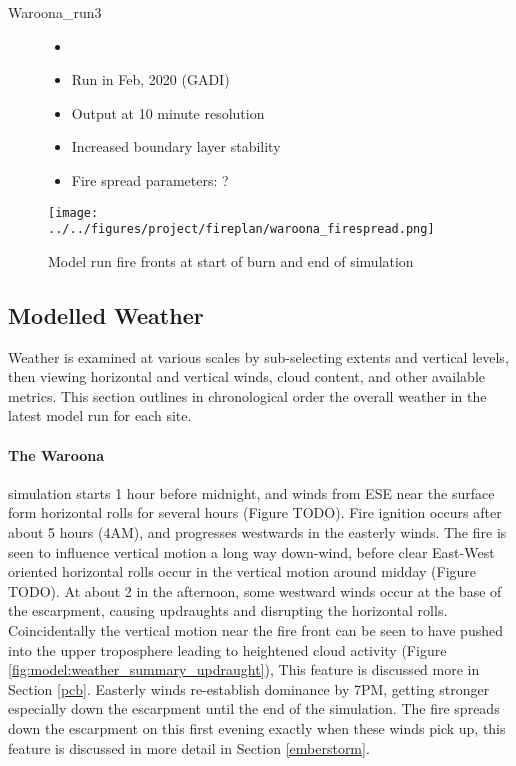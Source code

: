 \begin{description}
      \item [Waroona\_run3]
      \begin{itemize}
        \item []
        \item Run in Feb, 2020 (GADI)
        \item Output at 10 minute resolution
        \item Increased boundary layer stability
        \item Fire spread parameters: ?
      \end{itemize}
    \end{description}
    
    \begin{figure}
      \texttt{[image: ../../figures/project/fireplan/waroona\_firespread.png]}
      \caption{Model run fire fronts at start of burn and end of simulation}
      \label{fig:model:firespread_waroona}
    \end{figure}
    
    
  \subsection{Modelled Weather}
    \label{model:weather_summary}
    
    Weather is examined at various scales by sub-selecting extents and vertical levels, then viewing horizontal and vertical winds, cloud content, and other available metrics. This section outlines in chronological order the overall weather in the latest model run for each site.
    
    \paragraph{The Waroona} simulation starts 1 hour before midnight, and winds from ESE near the surface form horizontal rolls for several hours (Figure TODO). Fire ignition occurs after about 5 hours (4AM), and progresses westwards in the easterly winds. 
    The fire is seen to influence vertical motion a long way down-wind, before clear East-West oriented horizontal rolls occur in the vertical motion around midday (Figure TODO). 
    At about 2 in the afternoon, some westward winds occur at the base of the escarpment, causing updraughts and disrupting the horizontal rolls.
    Coincidentally the vertical motion near the fire front can be seen to have pushed into the upper troposphere leading to heightened cloud activity (Figure \ref{fig:model:weather_summary_updraught}), This feature is discussed more in Section \ref{pcb}.
    Easterly winds re-establish dominance by 7PM, getting stronger especially down the escarpment until the end of the simulation.
    The fire spreads down the escarpment on this first evening exactly when these winds pick up, this feature is discussed in more detail in Section \ref{emberstorm}.
    
